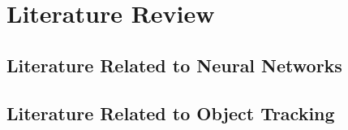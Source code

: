 \chapter{Literature Review} \label{chapter:2}

\section{Literature Related to Neural Networks}

\section{Literature Related to Object Tracking}